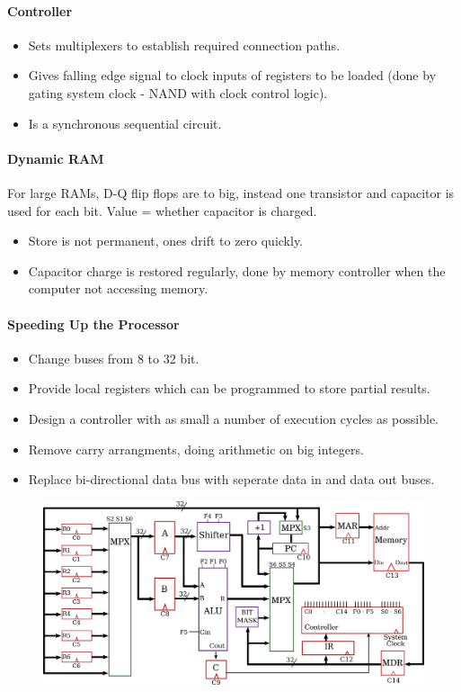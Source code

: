\documentclass[twocolumn,english]{article}
\begin{document}
\paragraph{Controller}
\begin{itemize}
\item Sets multiplexers to establish required connection paths.
\item Gives falling edge signal to clock inputs of registers to be loaded
(done by gating system clock - NAND with clock control logic).
\item Is a synchronous sequential circuit.
\end{itemize}

\paragraph{Dynamic RAM}

For large RAMs, D-Q flip flops are to big, instead one transistor
and capacitor is used for each bit. Value = whether capacitor is charged.
\begin{itemize}
\item Store is not permanent, ones drift to zero quickly.
\item Capacitor charge is restored regularly, done by memory controller
when the computer not accessing memory.
\end{itemize}

\paragraph{Speeding Up the Processor}
\begin{itemize}
\item Change buses from 8 to 32 bit.
\item Provide local registers which can be programmed to store partial results.
\item Design a controller with as small a number of execution cycles as
possible.
\item Remove carry arrangments, doing arithmetic on big integers.
\item Replace bi-directional data bus with seperate data in and data out
buses.
\end{itemize}
\begin{figure}[H]
\noindent \centering{}\includegraphics[width=0.325\paperwidth]{img/32-processor}
\end{figure}
\end{document}
